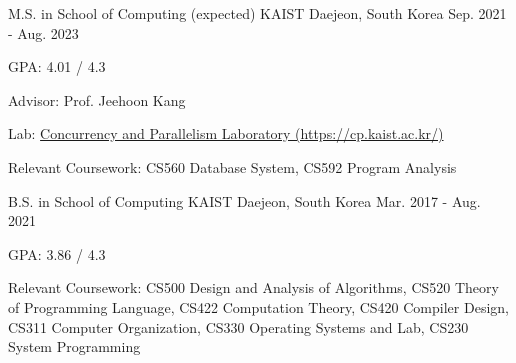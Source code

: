 

\begin{cventries}

  \cventry
    {M.S. in School of Computing (expected)} %
    {KAIST} %
    {Daejeon, South Korea} %
    {Sep. 2021 - Aug. 2023} %
    {
      \begin{cvitems} %
        \item {GPA: 4.01 / 4.3}
        \item {Advisor: Prof. Jeehoon Kang}
        \item {Lab: \href{https://cp.kaist.ac.kr/}{Concurrency and Parallelism Laboratory (https://cp.kaist.ac.kr/)} }
        \item {Relevant Coursework: CS560 Database System, CS592 Program Analysis}
      \end{cvitems}
    }

  \cventry
    {B.S. in School of Computing} %
    {KAIST} %
    {Daejeon, South Korea} %
    {Mar. 2017 - Aug. 2021} %
    {
      \begin{cvitems} %
        \item {GPA: 3.86 / 4.3}
        \item {Relevant Coursework: CS500 Design and Analysis of Algorithms, CS520 Theory of Programming Language, CS422 Computation Theory, CS420 Compiler Design, CS311 Computer Organization, CS330 Operating Systems and Lab, CS230 System Programming}
      \end{cvitems}
    }
\end{cventries}
